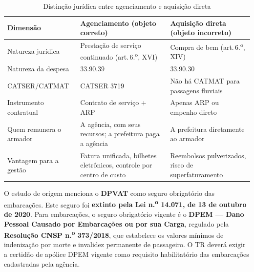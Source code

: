 \documentclass[12pt,a4paper]{article}
\newcommand{\art}[1]{art.\,#1}
\begin{document}
\begin{table}[H]\centering\small
\caption{Distinção jurídica entre agenciamento e aquisição direta}
\begin{tabular}{L{4.0cm} L{5.0cm} L{5.0cm}}
  \color{white}\textbf{Dimensão} &
  \color{white}\textbf{Agenciamento (objeto correto)} &
  \color{white}\textbf{Aquisição direta (objeto incorreto)} \\
  \toprule
  Natureza jurídica       & Prestação de serviço continuado
                            (\art{6.\textsuperscript{o}}, XVI) &
                            Compra de bem (\art{6.\textsuperscript{o}}, XIV) \\
  Natureza da despesa     & 33.90.39 & 33.90.30 \\
  CATSER/CATMAT           & CATSER 3719 &
                            Não há CATMAT para passagens fluviais \\
  Instrumento contratual  & Contrato de serviço + ARP &
                            Apenas ARP ou empenho direto \\
  Quem remunera o armador & A agência, com seus recursos;
                            a prefeitura paga a agência &
                            A prefeitura diretamente ao armador \\
  Vantagem para a gestão  & Fatura unificada, bilhetes eletrônicos,
                            controle por centro de custo &
                            Reembolsos pulverizados, risco de superfaturamento \\
  \bottomrule
\end{tabular}
\end{table}

\begin{corrbox}
\small
O estudo de origem menciona o \textbf{DPVAT} como seguro obrigatório das
embarcações. Este seguro foi \textbf{extinto pela Lei n.\textsuperscript{o}
14.071, de 13 de outubro de 2020}. Para embarcações, o seguro obrigatório
vigente é o \textbf{DPEM --- Dano Pessoal Causado por Embarcações ou por
sua Carga}, regulado pela \textbf{Resolução CNSP n.\textsuperscript{o}
373/2018}, que estabelece os valores mínimos de indenização por morte e
invalidez permanente de passageiro. O TR deverá exigir a certidão de apólice
DPEM vigente como requisito habilitatório das embarcações cadastradas pela
agência.
\end{corrbox}
\end{document}
